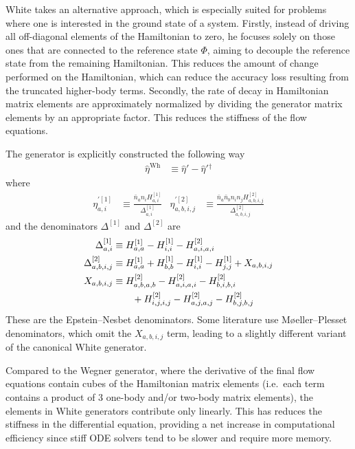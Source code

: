 White takes an alternative approach, which is especially suited for problems where one is interested in the ground state of a system.  Firstly, instead of driving all off-diagonal elements of the Hamiltonian to zero, he focuses solely on those ones that are connected to the reference state $\Phi$, aiming to decouple the reference state from the remaining Hamiltonian.  This reduces the amount of change performed on the Hamiltonian, which can reduce the accuracy loss resulting from the truncated higher-body terms.  Secondly, the rate of decay in Hamiltonian matrix elements are approximately normalized by dividing the generator matrix elements by an appropriate factor.  This reduces the stiffness of the flow equations.

The generator is explicitly constructed the following way \cite{PhysRevLett.106.222502,White:cond-mat0201346}
\begin{align*}
\hat{\eta}^{\text{Wh}} &\equiv \hat{\eta}' - \hat{\eta}'{}^\dagger
\end{align*}
where
\begin{align*}
\eta^{\prime [1]}_{a, i} &\equiv \frac{\bar{n}_a n_i H^{[1]}_{a, i}}{\Delta^{[1]}_{a, i}} &
\eta^{\prime [2]}_{a, b, i, j} &\equiv \frac{\bar{n}_a \bar{n}_b n_i n_j H^{[2]}_{a, b, i, j}}{\Delta^{[2]}_{a, b, i, j}}
\end{align*}
and the denominators $\Delta^{[1]}$ and $\Delta^{[2]}$ are
\begin{align*}
\Delta^{[1]}_{a, i} &\equiv H^{[1]}_{a, a} - H^{[1]}_{i, i} - H^{[2]}_{a, i, a, i} \\
\Delta^{[2]}_{a, b, i, j} &\equiv H^{[1]}_{a, a} + H^{[1]}_{b, b} - H^{[1]}_{i, i} - H^{[1]}_{j, j} + X_{a, b, i, j} \\
X_{a, b, i, j}
  &\equiv H^{[2]}_{a, b, a, b} - H^{[2]}_{a, i, a, i} - H^{[2]}_{b, i, b, i} \notag \\
  &\qquad + H^{[2]}_{i, j, i, j} - H^{[2]}_{a, j, a, j} - H^{[2]}_{b, j, b, j}
\end{align*}
These are the Epstein--Nesbet denominators.  Some literature use M\o eller--Plesset denominators, which omit the $X_{a, b, i, j}$ term, leading to a slightly different variant of the canonical White generator.

Compared to the Wegner generator, where the derivative of the final flow equations contain cubes of the Hamiltonian matrix elements (i.e.\ each term contains a product of 3 one-body and/or two-body matrix elements), the elements in White generators contribute only linearly.  This has reduces the stiffness in the differential equation, providing a net increase in computational efficiency since stiff ODE solvers tend to be slower and require more memory.

